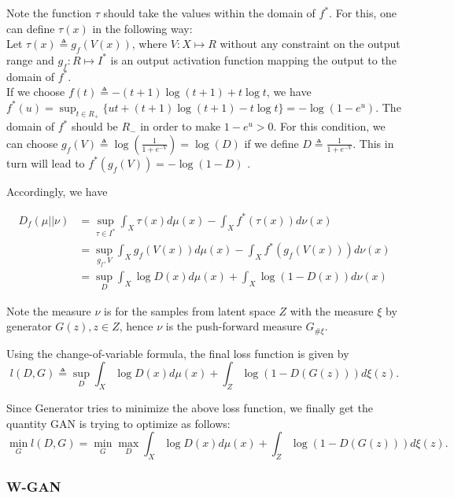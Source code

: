 \documentclass[12pt]{amsart}
\theoremstyle{plain}
\theoremstyle{definition}
\theoremstyle{remark}
\numberwithin{equation}{section}
\numberwithin{thm}{section}
\begin{document}
Note the function $\tau$ should take the values within the domain of $f^{*}$. For this, one can define $\tau(x)$ in the following way: \\
Let $\tau(x) \triangleq g_{f}(V(x))$, where $V: X \mapsto R$ without any constraint on the output range and $g_{f}:R \mapsto I^{*}$ is an output activation function mapping the output to the domain of $f^{*}$. \\
If we choose $f(t) \triangleq -(t+1)\log(t+1)+t\log t$, we have $f^{*}(u)=\sup_{t \in R_{+}} \{ ut+(t+1)\log(t+1)-t \log t \} = -\log(1-e^{u})$.
The domain of $f^{*}$ should be $R_{-}$ in order to make $1-e^{u} > 0$. For this condition, we can choose $g_{f}(V) \triangleq \log(\frac{1}{1+e^{-V}})= \log (D)$ if we define $D \triangleq \frac{1}{1+e^{-V}}$. This in turn will lead to $f^{*}(g_{f}(V)) = -\log(1-D)$ .

Accordingly, we have
 
\begin{equation*}
\begin{aligned}
     D_{f}(\mu||\nu) & = \sup_{\tau \in I^{*}} \int_{X} \tau(x) d\mu(x)-\int_{X}f^{*}(\tau(x))d\nu(x) \\
     & = \sup_{g_{f}, V} \int_{X} g_{f}(V(x)) d\mu(x)-\int_{X}f^{*}(g_{f}(V(x)))d\nu(x) \\
    & = \sup_{D} \int_{X} \log D(x) d\mu(x)+\int_{X} \log (1-D(x)) d\nu(x)
\end{aligned}
\end{equation*}

Note the measure $\nu$ is for the samples from latent space $Z$ with the measure $\xi$ by generator $G(z), z \in Z$, hence $\nu$ is the push-forward measure $G_{\#\xi}$.

Using the change-of-variable formula, the final loss function is given by \\
\begin{equation}
    l(D,G) \triangleq \sup_{D} \int_{X} \log D(x)d\mu(x)+\int_{Z}\log(1-D(G(z)))d\xi(z).
\end{equation}

Since Generator tries to minimize the above loss function, we finally get the quantity GAN is trying to optimize as follows:
\begin{equation}
    \min_{G} l(D,G) = \min_{G} \max_{D} \int_{X} \log D(x)d\mu(x)+\int_{Z}\log(1-D(G(z)))d\xi(z).
\end{equation}
\subsubsection{\textbf{W-GAN}}
\end{document}
